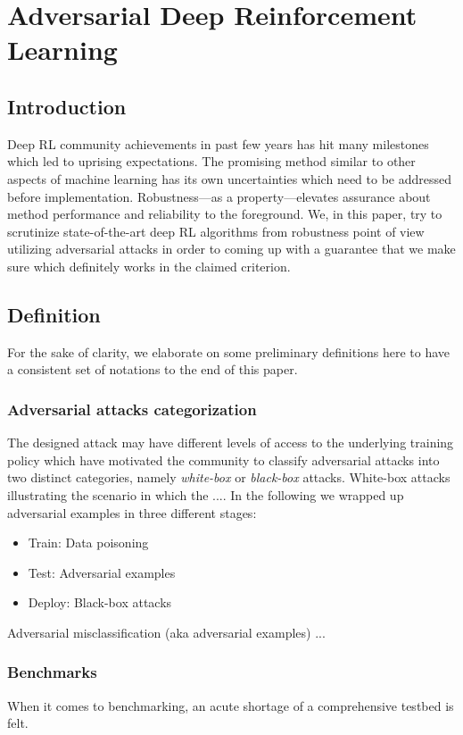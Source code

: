 \documentclass[a4paper,12pt]{article}
\begin{document}

\section{Adversarial Deep Reinforcement Learning}

\subsection{Introduction}
Deep RL community achievements in past few years has hit many milestones which led to uprising expectations. The promising method similar to other aspects of machine learning has its own uncertainties which need to be addressed before implementation. Robustness---as a property---elevates assurance about method performance and reliability to the foreground. We, in this paper, try to scrutinize state-of-the-art deep RL algorithms from robustness point of view utilizing adversarial attacks in order to coming up with a guarantee that we make sure which definitely works in the claimed criterion.

\subsection{Definition}
For the sake of clarity, we elaborate on some preliminary definitions here to have a consistent set of notations to the end of this paper.

\subsubsection{Adversarial attacks categorization}
The designed attack may have different levels of access to the underlying training policy which have motivated the community to classify adversarial attacks into two distinct categories, namely \textit{white-box} or \textit{black-box} attacks. White-box attacks illustrating the scenario in which the .... In the following we wrapped up adversarial examples in three different stages:
\begin{itemize}
    \item Train: Data poisoning
    \item Test: Adversarial examples
    \item Deploy: Black-box attacks
\end{itemize}
Adversarial misclassification (aka adversarial examples) ...

\subsubsection{Benchmarks}
When it comes to benchmarking, an acute shortage of a comprehensive testbed is felt.
 
\end{document}
